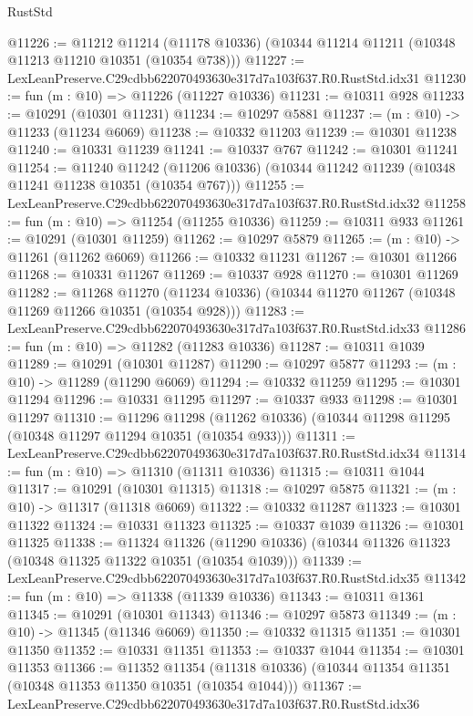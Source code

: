 \begin{lexlean}{RustStd}
\begin{coremodule}
@11226 := @11212
    @11214
    (@11178 @10336)
    (@10344 @11214 @11211 (@10348 @11213 @11210 @10351 (@10354 @738)))
@11227 := LexLeanPreserve.C29cdbb622070493630e317d7a103f637.R0.RustStd.idx31
@11230 := fun (m : @10) => @11226 (@11227 @10336)
@11231 := @10311 @928
@11233 := @10291 (@10301 @11231)
@11234 := @10297 @5881
@11237 := (m : @10) -> @11233 (@11234 @6069)
@11238 := @10332 @11203
@11239 := @10301 @11238
@11240 := @10331 @11239
@11241 := @10337 @767
@11242 := @10301 @11241
@11254 := @11240
    @11242
    (@11206 @10336)
    (@10344 @11242 @11239 (@10348 @11241 @11238 @10351 (@10354 @767)))
@11255 := LexLeanPreserve.C29cdbb622070493630e317d7a103f637.R0.RustStd.idx32
@11258 := fun (m : @10) => @11254 (@11255 @10336)
@11259 := @10311 @933
@11261 := @10291 (@10301 @11259)
@11262 := @10297 @5879
@11265 := (m : @10) -> @11261 (@11262 @6069)
@11266 := @10332 @11231
@11267 := @10301 @11266
@11268 := @10331 @11267
@11269 := @10337 @928
@11270 := @10301 @11269
@11282 := @11268
    @11270
    (@11234 @10336)
    (@10344 @11270 @11267 (@10348 @11269 @11266 @10351 (@10354 @928)))
@11283 := LexLeanPreserve.C29cdbb622070493630e317d7a103f637.R0.RustStd.idx33
@11286 := fun (m : @10) => @11282 (@11283 @10336)
@11287 := @10311 @1039
@11289 := @10291 (@10301 @11287)
@11290 := @10297 @5877
@11293 := (m : @10) -> @11289 (@11290 @6069)
@11294 := @10332 @11259
@11295 := @10301 @11294
@11296 := @10331 @11295
@11297 := @10337 @933
@11298 := @10301 @11297
@11310 := @11296
    @11298
    (@11262 @10336)
    (@10344 @11298 @11295 (@10348 @11297 @11294 @10351 (@10354 @933)))
@11311 := LexLeanPreserve.C29cdbb622070493630e317d7a103f637.R0.RustStd.idx34
@11314 := fun (m : @10) => @11310 (@11311 @10336)
@11315 := @10311 @1044
@11317 := @10291 (@10301 @11315)
@11318 := @10297 @5875
@11321 := (m : @10) -> @11317 (@11318 @6069)
@11322 := @10332 @11287
@11323 := @10301 @11322
@11324 := @10331 @11323
@11325 := @10337 @1039
@11326 := @10301 @11325
@11338 := @11324
    @11326
    (@11290 @10336)
    (@10344 @11326 @11323 (@10348 @11325 @11322 @10351 (@10354 @1039)))
@11339 := LexLeanPreserve.C29cdbb622070493630e317d7a103f637.R0.RustStd.idx35
@11342 := fun (m : @10) => @11338 (@11339 @10336)
@11343 := @10311 @1361
@11345 := @10291 (@10301 @11343)
@11346 := @10297 @5873
@11349 := (m : @10) -> @11345 (@11346 @6069)
@11350 := @10332 @11315
@11351 := @10301 @11350
@11352 := @10331 @11351
@11353 := @10337 @1044
@11354 := @10301 @11353
@11366 := @11352
    @11354
    (@11318 @10336)
    (@10344 @11354 @11351 (@10348 @11353 @11350 @10351 (@10354 @1044)))
@11367 := LexLeanPreserve.C29cdbb622070493630e317d7a103f637.R0.RustStd.idx36

\end{coremodule}
\end{lexlean}
